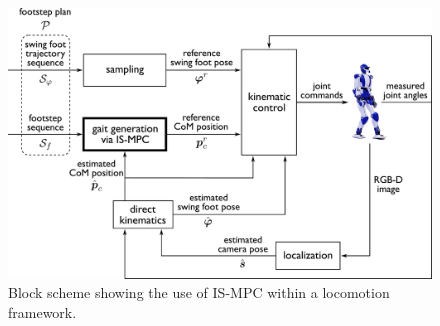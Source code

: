 \begin{figure}
    \centering
    \includegraphics[width=\textwidth]{figures/BlockSchemeISMPC.pdf}
    \caption{Block scheme showing the use of IS-MPC within a locomotion framework.}
    \label{fig:blockschemeISMPC}
\end{figure}

